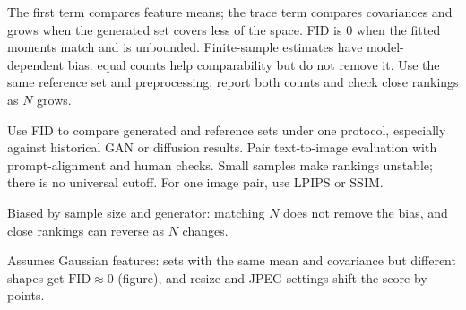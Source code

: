 \begin{metricformula}
\end{metricformula}

The first term compares feature means; the trace term compares covariances and grows when the generated set covers less of the space.
FID is $0$ when the fitted moments match and is unbounded. Finite-sample estimates have model-dependent bias: equal counts help
comparability but do not remove it. Use the same reference set and preprocessing, report both counts and check close rankings as $N$
grows.


Use FID to compare generated and reference sets under one protocol, especially against historical GAN or diffusion results. Pair text-to-image evaluation with prompt-alignment and human checks. Small samples make rankings unstable; there is no universal cutoff. For one image pair, use LPIPS or SSIM.


{
\item Biased by sample size and generator: matching $N$ does not remove the bias, and close rankings can reverse as $N$ changes.
\item Assumes Gaussian features: sets with the same mean and covariance but different shapes get $\text{FID} \approx 0$ (figure), and
resize and JPEG settings shift the score by points.
}

